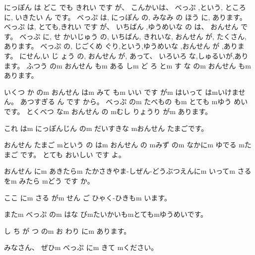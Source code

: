 \documentclass[letterpaper]{article}
\begin{document}
にっぽん は どこ でも きれい です が、 こんかいは、 べっぷ ,という,
ところに, いきたい ん です。 べっぷ は, にっぽん の, みなみ の ほう に,
あります。 べっぷ は, とても,きれい です が、 いちばん ,ゆうめいな の
は、 おんせん です。 べっぷ に, せ かいじゅう の, いちばん, きれいな,
おんせん が, たくさん, あります。 べっぷ の, じごくめ
ぐり,という,ゆうめいな ,おんせん が ,あります。 にせん,い じ ょう の,
おんせん が, あって、 いろいろ な,しゅるいが,あります。 ふつう のm
おんせん もm ある しm ど ろ とm す な のm おんせん もm あります。

いくつ か のm おんせん はm みて もm いい です がm はいって
はmいけません。 あつすぎる ん です から。 べっぷ のm たべもの もm とても
mゆう めい です。 とくべつ なm おんせん の mむし りょうり がm あります。

これ はm にっぽんじん のm だいすきな mおんせん たまごです。

おんせん たまご mという の はm おんせん の mみず のm なかにm ゆでる
mたまご です。 とても おいしい です よ。

おんせん にm あきたらm たかさきやま-しぜん-どうぶつえんにm いってm さる
をm みたら mどう です か。

ここ にm さる がm せん ご ひゃく-ひきもm います。

またm べっぷ のm はな びmたいかいもmとてもmゆうめいです。

し ち が つ のm お わり にm あります。

みなさん、 ぜひm べっぷ にm きて mください。
\end{document}

